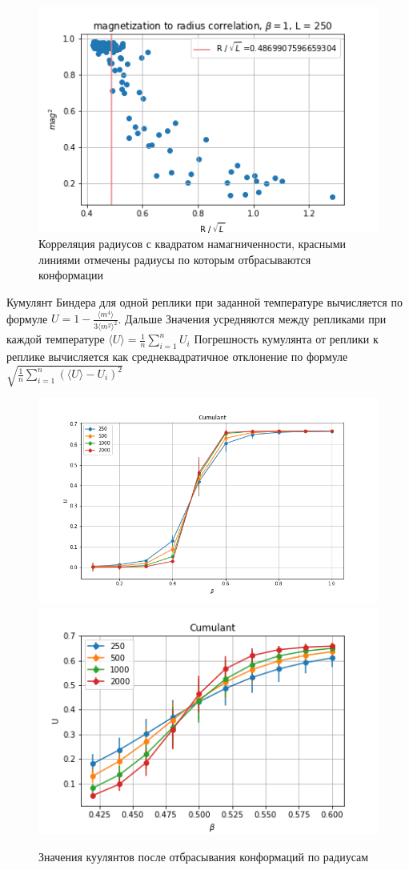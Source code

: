 \begin{figure}[h]
	\centering
	\includegraphics[width=1\textwidth]{../images/mag2_to_R_L250.png} 
	\caption{Корреляция радиусов с квадратом намагниченности, красными линиями отмечены радиусы по которым отбрасываются конформации}
	\label{fig:L250_mag_cor}
\end{figure}


Кумулянт Биндера для одной реплики при заданной температуре вычисляется по формуле $U = 1 - \frac{\langle m^4\rangle}{3\langle m^2\rangle ^2}$. Дальше Значения усредняются между репликами при каждой температуре $\langle U\rangle = \frac{1}{n}\sum_{i=1}^{n}U_i$ 
Погрешность кумулянта от реплики к реплике вычисляется как среднеквадратичное отклонение по формуле $\sqrt{\frac{1}{n}\sum_{i=1}^{n}(\langle U\rangle - U_i)^2}$


\begin{figure}[h]
	\centering
	\includegraphics[width=1\textwidth]{../images/Cumulant_big.png} 
	\includegraphics[width=1\textwidth]{../images/Cumulant_beta0.4_0.6.png} 
	\caption{Значения куулянтов после отбрасывания конформаций по радиусам}
\end{figure}
